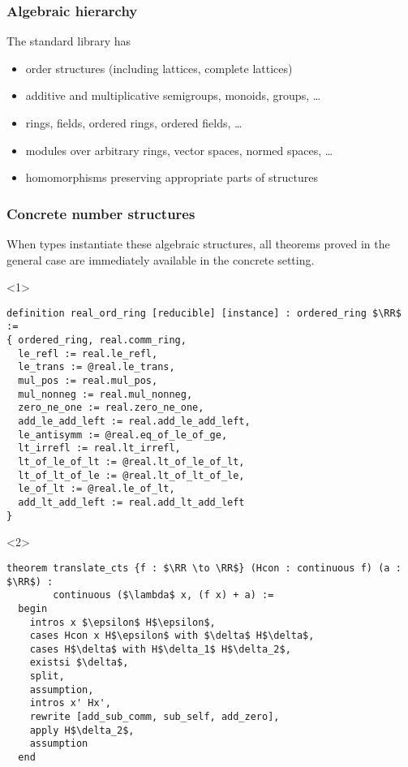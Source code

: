 \documentclass{beamer}
\newcommand{\RR}{\mathbb{R}}
\begin{document}
\begin{frame}
 \frametitle{Algebraic hierarchy}
 The standard library has 
\begin{itemize}
 \item order structures (including lattices, complete lattices)
 \item additive and multiplicative semigroups, monoids, groups, \ldots
 \item rings, fields, ordered rings, ordered fields, \ldots
 \item modules over arbitrary rings, vector spaces, normed spaces, \ldots
 \item homomorphisms preserving appropriate parts of structures
\end{itemize}
\end{frame}


\begin{frame}[fragile]
\frametitle{Concrete number structures}
When types instantiate these algebraic structures, all theorems proved in the general case are immediately available in the concrete setting.

\begin{onlyenv}<1>
\begin{lstlisting}[basicstyle=\footnotesize]
definition real_ord_ring [reducible] [instance] : ordered_ring $\RR$ :=
{ ordered_ring, real.comm_ring,
  le_refl := real.le_refl,
  le_trans := @real.le_trans,
  mul_pos := real.mul_pos,
  mul_nonneg := real.mul_nonneg,
  zero_ne_one := real.zero_ne_one,
  add_le_add_left := real.add_le_add_left,
  le_antisymm := @real.eq_of_le_of_ge,
  lt_irrefl := real.lt_irrefl,
  lt_of_le_of_lt := @real.lt_of_le_of_lt,
  lt_of_lt_of_le := @real.lt_of_lt_of_le,
  le_of_lt := @real.le_of_lt,
  add_lt_add_left := real.add_lt_add_left
}
\end{lstlisting}
\end{onlyenv}

\begin{onlyenv}<2>
\begin{lstlisting}[basicstyle=\footnotesize]
theorem translate_cts {f : $\RR \to \RR$} (Hcon : continuous f) (a : $\RR$) :
        continuous ($\lambda$ x, (f x) + a) :=
  begin
    intros x $\epsilon$ H$\epsilon$,
    cases Hcon x H$\epsilon$ with $\delta$ H$\delta$,
    cases H$\delta$ with H$\delta_1$ H$\delta_2$,
    existsi $\delta$,
    split,
    assumption,
    intros x' Hx',
    rewrite [add_sub_comm, sub_self, add_zero],
    apply H$\delta_2$,
    assumption
  end
\end{lstlisting}
\end{onlyenv}

\end{frame}
\end{document}
